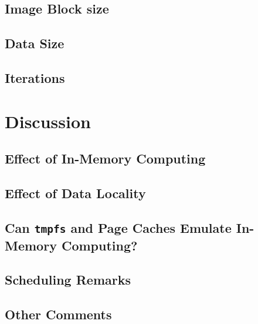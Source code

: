 \documentclass{IEEEtran}
\begin{document}
\subsection{Image Block size}

\subsection{Data Size}

\subsection{Iterations}


\section{Discussion} %
\label{sec:discussion}
\subsection{Effect of In-Memory Computing}

\subsection{Effect of Data Locality}




\subsection{Can \texttt{tmpfs} and Page Caches Emulate In-Memory Computing?}


\subsection{Scheduling Remarks}

\subsection{Other Comments}
\end{document}
